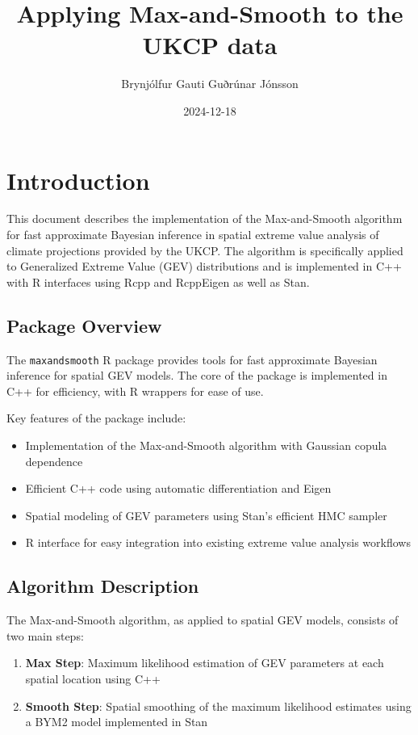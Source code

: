 \documentclass[
  letterpaper,
  DIV=11,
  numbers=noendperiod]{scrartcl}
\title{Applying Max-and-Smooth to the UKCP data}
\author{Brynjólfur Gauti Guðrúnar Jónsson}
\date{2024-12-18}
\providecommand{\tightlist}{%
  \setlength{\itemsep}{0pt}\setlength{\parskip}{0pt}}\usepackage{longtable,booktabs,array}
\begin{document}
\maketitle


\section{Introduction}\label{introduction}

This document describes the implementation of the Max-and-Smooth
algorithm for fast approximate Bayesian inference in spatial extreme
value analysis of climate projections provided by the UKCP. The
algorithm is specifically applied to Generalized Extreme Value (GEV)
distributions and is implemented in C++ with R interfaces using Rcpp and
RcppEigen as well as Stan.

\subsection{Package Overview}\label{package-overview}

The \texttt{maxandsmooth} R package provides tools for fast approximate
Bayesian inference for spatial GEV models. The core of the package is
implemented in C++ for efficiency, with R wrappers for ease of use.

Key features of the package include:

\begin{itemize}
\tightlist
\item
  Implementation of the Max-and-Smooth algorithm with Gaussian copula
  dependence
\item
  Efficient C++ code using automatic differentiation and Eigen
\item
  Spatial modeling of GEV parameters using Stan's efficient HMC sampler
\item
  R interface for easy integration into existing extreme value analysis
  workflows
\end{itemize}

\subsection{Algorithm Description}\label{algorithm-description}

The Max-and-Smooth algorithm, as applied to spatial GEV models, consists
of two main steps:

\begin{enumerate}
\def\labelenumi{\arabic{enumi}.}
\tightlist
\item
  \textbf{Max Step}: Maximum likelihood estimation of GEV parameters at
  each spatial location using C++
\item
  \textbf{Smooth Step}: Spatial smoothing of the maximum likelihood
  estimates using a BYM2 model implemented in Stan
\end{enumerate}
\end{document}
